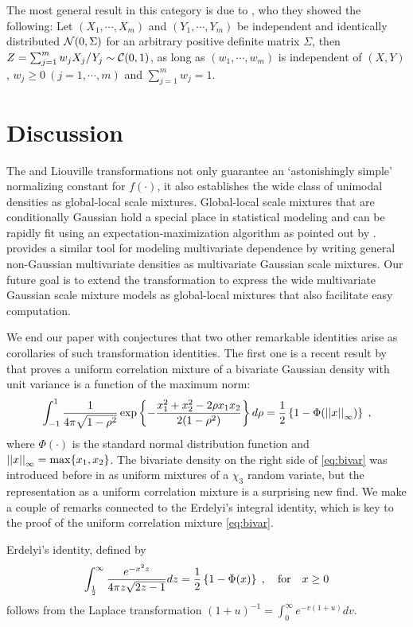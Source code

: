 \documentclass[lineno]{biometrika}
\begin{document}
The most general result in this category is due to \cite{pillai2015unexpected},
who they showed the following: 
Let $(X_1,\cdots,X_m)$ and $(Y_1, \cdots, Y_m)$ be independent and
identically distributed $\mathcal{N}(0, \Sigma)$ for an arbitrary
positive definite matrix $\Sigma$, then 
$Z = \sum_{j=1}^{m} w_j X_j / Y_j \sim \mathcal{C}(0, 1)$, 
as long as $(w_1, \cdots, w_m)$ is independent of $(X, Y)$,
$w_j \geq 0\ (j = 1, \cdots, m)$ and $\sum_{j=1}^{m} w_j = 1$. 

\section{Discussion}
\label{sec:discussion}

The \CS{} and Liouville transformations not only guarantee an `astonishingly
simple' normalizing constant for $f(\cdot)$, it also establishes the wide class
of unimodal densities as global-local scale mixtures. Global-local scale
mixtures that are conditionally Gaussian hold a special place in statistical
modeling and can be rapidly fit using an expectation-maximization algorithm as
pointed out by \cite{polson_data_2013}. \cite{palmer_amica:_2011} provides a
similar tool for modeling multivariate dependence by writing general
non-Gaussian multivariate densities as multivariate Gaussian scale mixtures.
Our future goal is to extend the \CS{} transformation to express the wide
multivariate Gaussian scale mixture models as global-local mixtures that also
facilitate easy computation.

We end our paper with conjectures that two other remarkable identities arise as
corollaries of such transformation identities. 
The first one is a recent result by \cite{zhang2014uniform} that proves a
uniform correlation mixture of a bivariate Gaussian density with unit variance
is a function of the maximum norm: 
\begin{equation}
  \int_{-1}^{1} \frac{1}{4 \pi \sqrt{1-\rho^2}} 
  \exp\left\{ - \frac{x_1^2 + x_2^2 - 2 \rho x_1 x_2}{2 (1-\rho^2)} \right\} d\rho = 
  \half \left\{1- \Phi(\vectornorm{x}_{\infty})\right\} 
  \;, 
  \label{eq:bivar}
\end{equation}
where $\Phi(\cdot)$ is the standard normal distribution function and
$\left|\left|x\right|\right|_{\infty} = \max\{ x_1, x_2\}$. The bivariate density on the
right side of \eqref{eq:bivar} was introduced before in
\cite{bryson1982constructing} as uniform mixtures of a $\chi_3$ random variate,
but the representation as a uniform correlation mixture is a surprising new
find.  We make a couple of remarks connected to the Erdelyi's integral identity,
which is key to the proof of the uniform correlation mixture \eqref{eq:bivar}. 
\begin{theorem}
Erdelyi's identity, defined by
\begin{equation}
  \int_{\half}^{\infty} \frac{e^{-x^2 z}}{4 \pi z 	\sqrt{2z-1}} dz = 
  \half \left\{1-\Phi(x)\right\}
  \;, \quad \text{for}\quad x \geq 0 
  \label{eq:erdelyi}
\end{equation}
follows from the Laplace transformation $(1+u)^{-1} = \int_0^{\infty} e^{-v(1+u)} dv$. 
\end{theorem}
\end{document}
